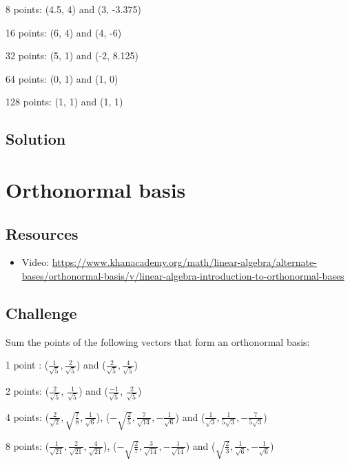 8 points: (4.5, 4) and (3, -3.375)

16 points: (6, 4) and (4, -6)

32 points: (5, 1) and (-2, 8.125)

64 points: (0, 1) and (1, 0)

128 points: (1, 1) and (1, 1)

\subsection*{Solution}
\six{}





\newpage
\section{Orthonormal basis}

\subsection*{Resources}
\begin{itemize}
    \item Video: \url{https://www.khanacademy.org/math/linear-algebra/alternate-bases/orthonormal-basis/v/linear-algebra-introduction-to-orthonormal-bases}
\end{itemize}

\subsection*{Challenge}
Sum the points of the following vectors that form an orthonormal basis:

1 point :
($\displaystyle \frac{1}{\sqrt{5}}, \frac{2}{\sqrt{5}}$) and
($\displaystyle \frac{2}{\sqrt{5}}, \frac{4}{\sqrt{5}}$)

2 points:
($\displaystyle \frac{2}{\sqrt{5}}$, $\displaystyle \frac{1}{\sqrt{5}}$) and
($\displaystyle \frac{-1}{\sqrt{5}}$, $\displaystyle \frac{2}{\sqrt{5}}$)

4 points:
($\displaystyle \frac{2}{\sqrt{2}}, \sqrt{\frac{7}{8}}, \frac{1}{\sqrt{6}}$),
($\displaystyle -\sqrt{\frac{2}{5}}, \frac{7}{\sqrt{14}}, -\frac{1}{\sqrt{6}}$) and
($\displaystyle \frac{1}{\sqrt{3}},  \frac{1}{5 \sqrt{3}}, -\frac{7}{5 \sqrt{3}}$)

8 points:
($\displaystyle \frac{1}{\sqrt{21}}, \frac{2}{\sqrt{21}}, \frac{4}{\sqrt{21}}$),
($\displaystyle -\sqrt{\frac{2}{7}}, \frac{3}{\sqrt{14}}, -\frac{1}{\sqrt{14}}$) and
($\displaystyle \sqrt{\frac{2}{3}},  \frac{1}{\sqrt{6}}, -\frac{1}{\sqrt{6}}$)

